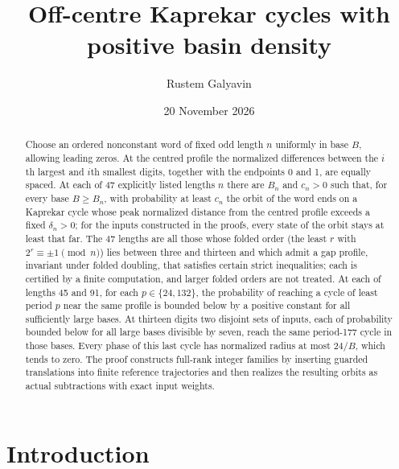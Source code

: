 \documentclass[11pt,reqno]{amsart}
\title[Off-centre Kaprekar cycles]{Off-centre Kaprekar cycles with positive basin density}
\author{Rustem Galyavin}
\date{20 November 2026}
\theoremstyle{remark}
\begin{document}
\raggedbottom
\begin{abstract}
Choose an ordered nonconstant word of fixed odd length \(n\) uniformly in
base \(B\), allowing leading zeros. At the centred profile the
normalized differences between the \(i\)th largest and \(i\)th smallest
digits, together with the endpoints 0 and 1, are equally spaced. At each of 47 explicitly listed lengths \(n\) there are
\(B_n\) and \(c_n>0\) such that, for every base \(B\ge B_n\), with
probability at least \(c_n\) the orbit of the word ends on a Kaprekar
cycle whose peak normalized distance from the centred profile exceeds a
fixed \(\delta_n>0\); for the inputs constructed in the proofs, every
state of the orbit stays at least that far. The
47 lengths are all those whose folded order (the least \(r\) with
\(2^r\equiv\pm1\pmod n\)) lies between three and thirteen and which admit
a gap profile, invariant under folded doubling, that satisfies certain
strict inequalities; each is certified by a finite computation, and
larger folded orders are not treated. At each of lengths 45 and 91, for each \(p\in\{24,132\}\), the
probability of reaching a cycle of least period \(p\) near the same
profile is bounded below by a positive constant for all sufficiently
large bases. At thirteen
digits two disjoint sets of inputs, each of probability bounded below
for all large bases divisible by seven, reach the same period-177 cycle
in those bases. Every phase of this last cycle has normalized radius at
most \(24/B\), which tends to zero. The proof
constructs full-rank integer families by inserting guarded translations
into finite reference trajectories and then realizes the resulting
orbits as actual subtractions with exact input weights.
\end{abstract}
\maketitle

\section{Introduction}
\end{document}
